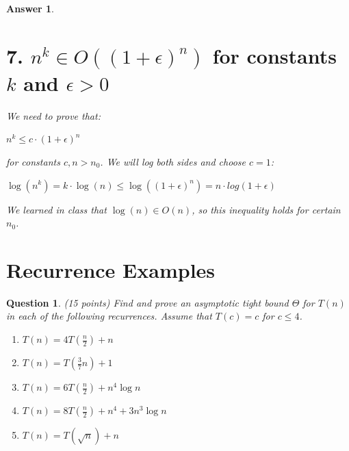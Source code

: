 \documentclass[a4paper]{article}
\theoremstyle{remarksStyle}
\theoremstyle{questionStyle}
\newtheorem{question}{Question}
\theoremstyle{answerStyle}
\newtheorem{answer}{Answer}
\begin{document}
\begin{answer}
\section*{7. \( n^k \in O((1+\epsilon)^n) \) for constants \( k \) and \( \epsilon > 0 \) }

\item We need to prove that:
\item \begin{center} $n^k \leq c \cdot (1+\epsilon)^n$ \end{center}
for constants $c, n > n_0$. We will log both sides and choose $c = 1$: 
\begin{center} 
$\log(n^k) = k \cdot \log(n) \leq \log((1+\epsilon)^n) = n \cdot log(1 + \epsilon)$
\end{center}
We learned in class that $\log(n) \in O(n)$, so this inequality holds for certain $n_0$.

\end{answer}

\newpage

\section {Recurrence Examples}
\begin{question} (15 points)
Find and prove an asymptotic tight bound $\Theta$ for $T(n)$ in each of the following recurrences. Assume that $T(c) = c$ for $c \le 4$.
\begin{enumerate}
    \item $T(n) = 4T(\frac{n}{2}) + n$
    \item $T(n) = T(\frac{3}{7}n) + 1$
    \item $T(n) = 6T(\frac{n}{2}) + n^4 \log{n}$
    \item $T(n) = 8T(\frac{n}{2}) + n^4 + 3n^3  \log{n} $
    \item $T(n) = T(\sqrt{n}) + n $
    
\end{enumerate}
\end{question}
\end{document}

